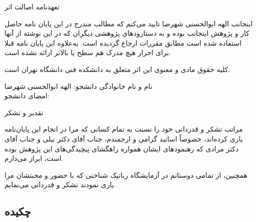 \documentclass[twoside, a4paper,11pt]{book}
\numberwithin{equation}{chapter}
\numberwithin{table}{chapter}
\numberwithin{figure}{chapter}
\numberwithin{equation}{chapter}
\begin{document}
\newpage
\thispagestyle{empty}
\mbox{}

\newpage
\thispagestyle{empty}
{ \LARGE 
\begin{center}
تعهدنامه اصالت اثر
\end{center}}
اینجانب الهه ابوالحسنی شهرضا تایید می‌کنم که مطالب مندرج در این پایان نامه حاصل کار و پژوهش اینجانب بوده و به دستارود‌های پژوهشی دیگران که در این نوشته از آنها استفاده شده است مطابق مقررات ارجاع گردیده است. به‌علاوه این پایان نامه قبلا برای احراز هیچ مدرک هم سطح یا بالاتر ارائه نشده است.
\par
کلیه حقوق مادی و معنوی این اثر متعلق به دانشکده فنی دانشگاه تهران است.
\par 
\vskip 2cm


\begin{flushleft}
نام و نام خانوادگی دانشجو: الهه ابوالحسنی شهرضا \hspace{1.75cm}~~~~~~~ \\
امضای دانشجو: ~~~~~~~~~~~~~~~~~~~~~~~~~~~~~~~~~~~~~~~~~~~~~~~~~~~~~
\end{flushleft}

\newpage
\thispagestyle{empty}
\mbox{}




\newpage
\thispagestyle{empty}
\mbox{}


\newpage
\thispagestyle{empty}
{\nastaliqbig \Huge 
تقدیر و تشکر\nastaliq

{\par\vspace{1cm}}
\LARGE
\begin{adjustwidth}{1cm}{}
مراتب تشکر و قدردانی خود را نسبت به تمام کسانی که مرا در انجام این پایان‌نامه یاری کرده‌اند، خصوصاً اساتید گرامی و ارجمندم، جناب آقای دکتر نیلی و جناب آقای دکتر مرادی که رهنمودهای ایشان همواره راهگشای پیچیدگی‌های این پژوهش بوده است، ابراز می‌دارم. 

همچنین، از تمامی دوستانم در آزمایشگاه رباتیک شناختی که با حضور و محبتشان مرا یاری نمودند تشکر و قدردانی می‌نمایم. 

\end{adjustwidth}
}


\newpage
\thispagestyle{empty}
\mbox{}


\pagestyle{plain}

\newpage


\vspace*{-2.6cm}
\subsection*{چکیده}
\end{document}
